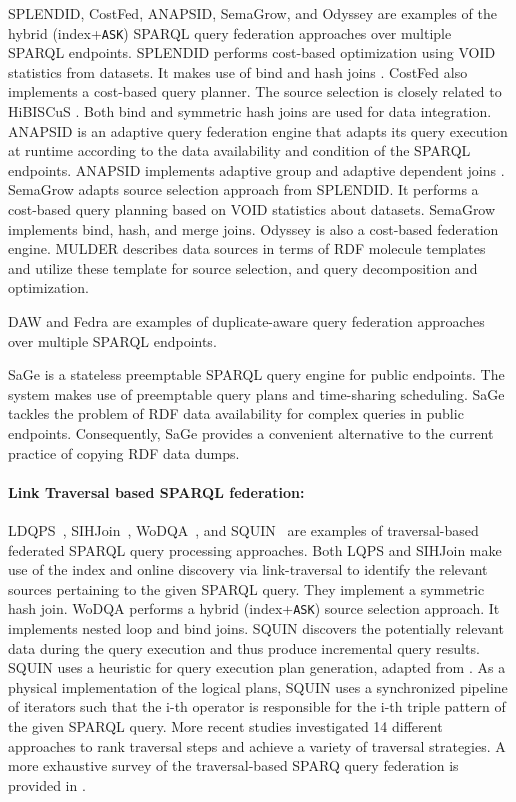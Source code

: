 \documentclass[sw]{iosart2x}
\begin{document}
SPLENDID, CostFed, ANAPSID, SemaGrow, and Odyssey are examples of the hybrid (index+\texttt{ASK}) SPARQL query federation approaches over multiple SPARQL endpoints. SPLENDID performs cost-based optimization using VOID statistics from datasets.
It makes use of bind and hash joins \cite{saleem2015fine}. %
CostFed also implements a cost-based query planner.
The source selection is closely related to HiBISCuS \cite{hibiscus2014}.
Both bind and symmetric hash joins are used for data integration.
ANAPSID \cite{anapsid2011} is an adaptive query federation engine that adapts its query execution at runtime according to the data availability and condition of the SPARQL endpoints.
ANAPSID implements adaptive group and adaptive dependent joins \cite{saleem2015fine}.
SemaGrow adapts source selection approach from SPLENDID.
It performs a cost-based query planning based on VOID statistics about datasets.
SemaGrow implements bind, hash, and merge joins.
Odyssey is also a cost-based federation engine.
MULDER describes data sources in terms of RDF molecule templates and utilize these template for source selection, and query decomposition and optimization.

DAW \cite{daw2013} and Fedra \cite{fedra2015} are examples of duplicate-aware query federation approaches over multiple SPARQL endpoints.

SaGe\cite{DBLP:journals/corr/abs-1806-00227} is a stateless preemptable SPARQL query engine for public endpoints.
The system makes use of preemptable query plans and time-sharing scheduling.
SaGe tackles the problem of RDF data availability for complex queries in public endpoints.
Consequently, SaGe provides a convenient alternative to the current practice of copying RDF data dumps.

\paragraph*{\textbf{Link Traversal based SPARQL federation:}} LDQPS~\cite{ldqp2010}, SIHJoin~\cite{sihjoin2011}, WoDQA~\cite{wodqa2012}, and SQUIN~\cite{hartig2013squin} are examples of traversal-based federated SPARQL query processing approaches. 
Both LQPS and SIHJoin make use of the index and online discovery via link-traversal to identify the relevant sources pertaining to the given SPARQL query.
They implement a symmetric hash join.
WoDQA performs a hybrid (index+\texttt{ASK}) source selection approach.
It implements nested loop and bind joins.
SQUIN discovers the potentially relevant data during the query execution and thus produce incremental query results.
SQUIN uses a heuristic for query execution plan generation, adapted from \cite{zk2011}.
As a physical implementation of the logical plans, SQUIN uses a synchronized pipeline of iterators such that the i-th operator is responsible for the i-th triple pattern of the given SPARQL query.
More recent studies \cite{hartig2016walking} investigated 14 different approaches to rank traversal steps and achieve a variety of traversal strategies.
A more exhaustive survey of the traversal-based SPARQ query federation is provided in \cite{hartig2009executing}.
\end{document}
